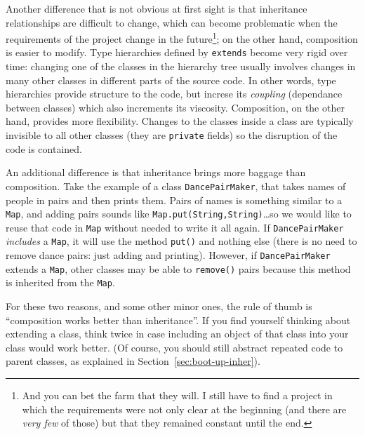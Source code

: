 Another difference that is not obvious at first sight is that 
inheritance relationships are difficult to change, which can 
become problematic when the requirements
of the project change in the future\footnote{And you can bet the farm
  that they will. I still have to find a project in which the
  requirements were not only clear at the beginning (and there are
  \emph{very few} of those) but that they remained constant until the end.}; 
on the other hand, composition is
easier to modify. Type hierarchies defined by \verb+extends+ become
very rigid over time: changing one of the classes in the hierarchy
tree usually involves changes in many other classes in different parts
of the source code. In other words, type hierarchies provide structure
to the code, but increse its \emph{coupling} (dependance between classes) 
which also increments its viscosity. Composition, on
the other hand, provides more flexibility. Changes to the classes
inside a class are typically invisible to all other classes (they are
\verb+private+ fields) so the disruption of the code is contained. 

An additional difference is that inheritance brings more baggage than
composition. Take the example of a class \verb+DancePairMaker+, that
takes names of people in pairs and then prints them. Pairs of names
is something similar to a \verb+Map+, and adding pairs sounds like
\verb+Map.put(String,String)+\ldots so we would like to reuse that
code in \verb+Map+ without needed to write it all again. 
If \verb+DancePairMaker+ \emph{includes} a
\verb+Map+, it will use the method \verb+put()+ and nothing
else (there is no need to remove dance pairs: just adding and
printing). 
However, if \verb+DancePairMaker+ extends a \verb+Map+, other
classes may be able to \verb+remove()+ pairs because this method is
inherited from the \verb+Map+. 

For these two reasons, and some other minor ones, the rule of thumb is
``composition works better than inheritance''. If you find yourself
thinking about extending a class, think twice in case including an
object of that class into your class would work better. (Of course,
you should still abstract repeated code to parent classes, as
explained in Section~\ref{sec:boot-up-inher}).





